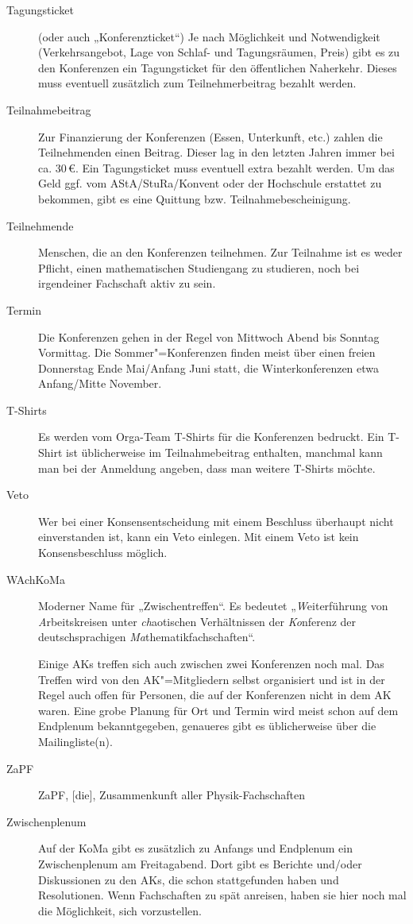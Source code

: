 \begin{description}
\item[Tagungsticket]
    (oder auch „Konferenzticket“) Je nach Möglichkeit und Notwendigkeit (Verkehrsangebot, Lage von Schlaf- und Tagungsräumen, Preis) gibt es zu den Konferenzen ein Tagungsticket für den öffentlichen Naherkehr. Dieses muss eventuell zusätzlich zum Teilnehmerbeitrag bezahlt werden.

\item[Teilnahmebeitrag]
    Zur Finanzierung der Konferenzen (Essen, Unterkunft, etc.) zahlen die Teilnehmenden einen Beitrag. Dieser lag in den letzten Jahren immer bei ca. 30\,€. Ein Tagungsticket muss eventuell extra bezahlt werden. Um das Geld ggf. vom AStA/StuRa/Konvent oder der Hochschule erstattet zu bekommen, gibt es eine Quittung bzw. Teilnahmebescheinigung.

\item[Teilnehmende]
    Menschen, die an den Konferenzen teilnehmen. Zur Teilnahme ist es weder Pflicht, einen mathematischen Studiengang zu studieren, noch bei irgendeiner Fachschaft aktiv zu sein.

\item[Termin]
    Die Konferenzen gehen in der Regel von Mittwoch Abend bis Sonntag Vormittag. Die Sommer"=Konferenzen finden meist über einen freien Donnerstag Ende Mai/Anfang Juni statt, die Winterkonferenzen etwa Anfang/Mitte November.

\item[T-Shirts]
    Es werden vom Orga-Team T-Shirts für die Konferenzen bedruckt. Ein T-Shirt ist üblicherweise im Teilnahmebeitrag enthalten, manchmal kann man bei der Anmeldung angeben, dass man weitere T-Shirts möchte.

\item[Veto]
    Wer bei einer Konsensentscheidung mit einem Beschluss überhaupt nicht einverstanden ist, kann ein Veto einlegen. Mit einem Veto ist kein Konsensbeschluss möglich.

\item[WAchKoMa]
    Moderner Name für „Zwischentreffen“. Es bedeutet „\emph{W}ei\-ter\-füh\-rung	von \emph{A}rbeitskreisen unter \emph{ch}aotischen Verhältnissen der \emph{Ko}nferenz der deutschsprachigen \emph{Ma}thematikfachschaften“.
    
    Einige AKs treffen sich auch zwischen zwei Konferenzen noch mal. Das Treffen wird von den AK"=Mitgliedern selbst organisiert und ist in der Regel auch offen für Personen, die auf der Konferenzen nicht in dem AK waren.  Eine grobe Planung für Ort und Termin wird meist schon auf dem Endplenum bekanntgegeben, genaueres gibt es üblicherweise über die Mailingliste(n).

\item[ZaPF]
    ZaPF, [die], Zusammenkunft aller Physik-Fachschaften

\item[Zwischenplenum]
    Auf der KoMa gibt es zusätzlich zu Anfangs und Endplenum ein Zwischenplenum am Freitagabend.  Dort gibt es Berichte und/oder Diskussionen zu den AKs, die schon stattgefunden haben und Resolutionen. Wenn Fachschaften zu spät anreisen, haben sie hier noch mal die Möglichkeit, sich vorzustellen.
\end{description}
